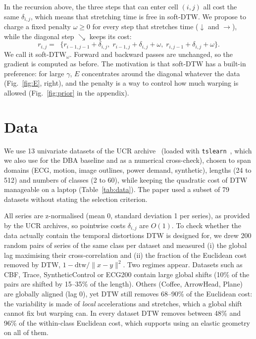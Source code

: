 \documentclass[11pt]{article}
\newcommand{\minop}{\mathop{\mathrm{min}^\gamma}}
\begin{document}
In the recursion above, the three steps that can enter cell $(i,j)$ all cost the same $\delta_{i,j}$, which means that stretching time is free in soft-DTW. We propose to charge a fixed penalty $\omega\ge0$ for every step that stretches time ($\downarrow$ and $\rightarrow$), while the diagonal step $\searrow$ keeps its cost:
\begin{equation}
r_{i,j}=\minop\{r_{i-1,j-1}+\delta_{i,j},\; r_{i-1,j}+\delta_{i,j}+\omega,\; r_{i,j-1}+\delta_{i,j}+\omega\}.
\end{equation}
We call it soft-DTW$_\omega$. Forward and backward passes are unchanged, so the gradient is computed as before. The motivation is that soft-DTW has a built-in preference: for large $\gamma$, $E$ concentrates around the diagonal whatever the data (Fig.~\ref{fig:E}, right), and the penalty is a way to control how much warping is allowed (Fig.~\ref{fig:prior} in the appendix).

\section{Data}
\label{sec:data}

We use 13 univariate datasets of the UCR archive~\cite{ucr2018} (loaded with \texttt{tslearn}~\cite{tavenard2020tslearn}, which we also use for the DBA baseline and as a numerical cross-check), chosen to span domains (ECG, motion, image outlines, power demand, synthetic), lengths (24 to 512) and numbers of classes (2 to 60), while keeping the quadratic cost of DTW manageable on a laptop (Table~\ref{tab:data}). The paper used a subset of 79 datasets without stating the selection criterion.

All series are z-normalised (mean 0, standard deviation 1 per series), as provided by the UCR archives, so pointwise costs $\delta_{i,j}$ are $O(1)$. To check whether the data actually contain the temporal distortions DTW is designed for, we drew 200 random pairs of series of the same class per dataset and measured (i) the global lag maximising their cross-correlation and (ii) the fraction of the Euclidean cost removed by DTW, $1-\mathrm{dtw}/\|x-y\|^2$. Two regimes appear. Datasets such as CBF, Trace, SyntheticControl or ECG200 contain large global shifts (10\% of the pairs are shifted by 15--35\% of the length). Others (Coffee, ArrowHead, Plane) are globally aligned (lag $0$), yet DTW still removes 68--90\% of the Euclidean cost: the variability is made of \emph{local} accelerations and stretches, which a global shift cannot fix but warping can. In every dataset DTW removes between 48\% and 96\% of the within-class Euclidean cost, which supports using an elastic geometry on all of them.
\end{document}
